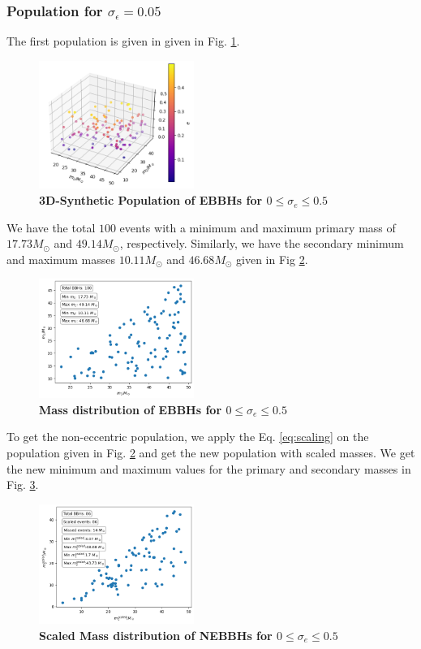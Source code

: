\documentclass[twocolumn,prd,nofootinbib]{revtex4}
\begin{document}
\subsubsection{Population for $\sigma_\epsilon = 0.05$ }
The first population is given in 
  given in Fig. \ref{fig:pop3d05}.  

\begin{figure}[H]
\includegraphics[width=0.45\textwidth]{paper/figures/pop3d05.png}
\caption{\label{fig:pop3d05}\textbf{3D-Synthetic Population of EBBHs for $0\leq \sigma_e \leq 0.5$}}
\end{figure}

We have the total $100$ events with a minimum and maximum primary mass of $17.73 M_\odot$ and $49.14 M_\odot$, respectively. Similarly, we have the secondary minimum and maximum masses $10.11 M_\odot$ and $46.68 M_\odot$ given in Fig \ref{fig:pop2d05}.

\begin{figure}[H]
\includegraphics[width=0.45\textwidth]{paper/figures/pop2d05.png}
\caption{\label{fig:pop2d05}\textbf{Mass distribution of EBBHs for $0\leq \sigma_e \leq 0.5$}}
\end{figure}

To get the non-eccentric population, we apply the Eq. \ref{eq:scaling} on the population given in Fig. \ref{fig:pop2d05} and get the new population with scaled masses. We get the new minimum and maximum values for the primary and secondary masses in Fig. \ref{fig:pop2dscal05}. 
   
\begin{figure}[H]
\includegraphics[width=0.45\textwidth]{paper/figures/pop2d05scl.png}
\caption{\label{fig:pop2dscal05}\textbf{Scaled Mass distribution of NEBBHs for  $0\leq \sigma_e \leq 0.5$}}
\end{figure}
\end{document}
